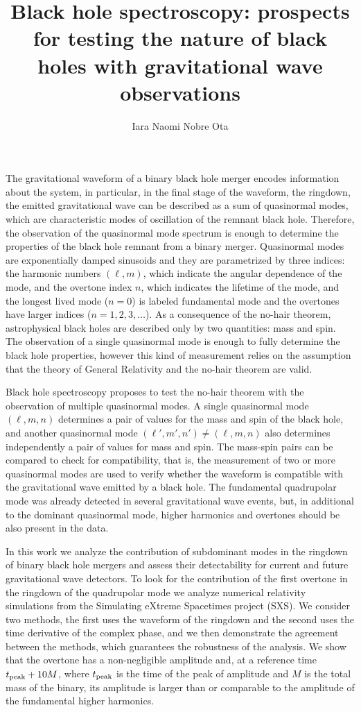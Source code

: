 \documentclass[a4paper]{article}
\title{\vspace{-0cm}Black hole spectroscopy: prospects for testing the nature of black holes with gravitational wave observations
}
\author{Iara Naomi Nobre Ota}
\date{}
\begin{document}
\maketitle 
The gravitational waveform of a binary black hole merger encodes information about the system, in particular, in the final stage of the waveform, the ringdown, the emitted gravitational wave can be described as a sum of quasinormal modes, which are characteristic modes of oscillation of the remnant black hole. 
Therefore, the observation of the quasinormal mode spectrum is enough to determine the properties of the black hole remnant from a binary merger.
Quasinormal modes are exponentially damped sinusoids and they are parametrized by three indices: the harmonic numbers $(\ell, m)$, which indicate the angular dependence of the mode, and the overtone index $n$, which indicates the lifetime of the mode, and the longest lived mode ($n=0$) is labeled fundamental mode and the overtones have larger indices ($n = 1, 2, 3, \ldots$).
As a consequence of the no-hair theorem, astrophysical black holes are described only by two quantities: mass and spin. 
The observation of a single quasinormal mode is enough to fully determine the black hole properties, however this kind of measurement relies on the assumption that the theory of General Relativity and the no-hair theorem are valid.

Black hole spectroscopy proposes to test the no-hair theorem with the observation of multiple quasinormal modes. 
A single quasinormal mode $(\ell, m, n)$ determines a pair of values for the mass and spin of the black hole, and another quasinormal mode $(\ell', m', n') \neq (\ell, m, n)$ also determines independently a pair of values for mass and spin. 
The mass-spin pairs can be compared to check for compatibility, that is, the measurement of two or more quasinormal modes are used to verify whether the waveform is compatible with the gravitational wave emitted by a black hole.
The  fundamental quadrupolar mode was already detected in several gravitational wave events, but, in additional to the dominant quasinormal mode, higher harmonics and overtones should be also present in the data.

In this work we analyze the contribution of subdominant modes in the ringdown of binary black hole mergers and assess their detectability for current and future gravitational wave detectors.
To look for the contribution of the first overtone in the ringdown of the quadrupolar mode we analyze numerical relativity simulations from the Simulating eXtreme Spacetimes project (SXS).
We consider two methods, the first uses the waveform of the ringdown and the second uses the time derivative of the complex phase, and we then demonstrate the agreement between the methods, which guarantees the robustness of the analysis. 
We show that the overtone has a non-negligible amplitude and, at a reference time $t_{\rm peak} + 10M$, where $t_{\rm peak}$ is the time of the peak of amplitude and $M$ is the total mass of the binary, its amplitude is larger than or comparable to the amplitude of the fundamental higher harmonics.
\end{document}
